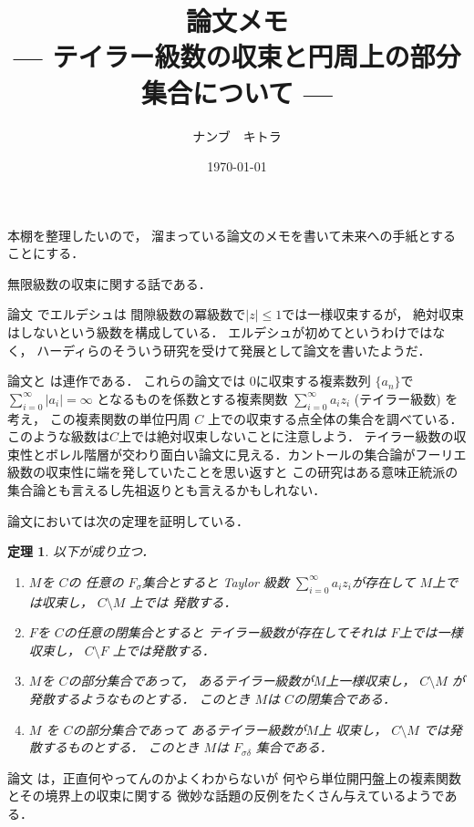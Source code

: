 \documentclass[leqno, a4paper, 12pt]{jsarticle}
\title{論文メモ
\large{\\--- テイラー級数の収束と円周上の部分集合について ---}
}
\author{ナンブ　キトラ}
\date{\today}
\newtheorem{thm}{定理}
\begin{document}
\maketitle

本棚を整理したいので，
溜まっている論文のメモを書いて未来への手紙とすることにする．


無限級数の収束に関する話である．

論文
\cite{MR0058734}でエルデシュは
間隙級数の冪級数で$|z|\le 1$では一様収束するが，
絶対収束はしないという級数を構成している．
エルデシュが初めてというわけではなく，
ハーディらのそういう研究を受けて発展として論文を書いたようだ．

論文\cite{MR0031049}と
\cite{MR0053210}
は連作である．
これらの論文では
$0$に収束する複素数列
$\{a_{n}\}$で
$\sum_{i=0}^{\infty}|a_{i}|=\infty$
となるものを係数とする複素関数
$\sum_{i=0}^{\infty}a_{i}z_{i}$
(テイラー級数)
を
考え，
この複素関数の単位円周
$C$
上での収束する点全体の集合を調べている．
このような級数は$C$上では絶対収束しないことに注意しよう．
テイラー級数の収束性とボレル階層が交わり面白い論文に見える．カントールの集合論がフーリエ級数の収束性に端を発していたことを思い返すと
この研究はある意味正統派の集合論とも言えるし先祖返りとも言えるかもしれない．

論文\cite{MR0031049}においては次の定理を証明している．
\begin{thm}
以下が成り立つ．
\begin{enumerate}[label=\textup{(\arabic*)}]
\item 
$M$を
$C$の
任意の
$F_{\sigma}$集合とすると
Taylor 級数
$\sum_{i=0}^{\infty}a_{i}z_{i}$が存在して
$M$上では収束し，
$C\setminus M$
上では
発散する．

\item 
$F$を
$C$の任意の閉集合とすると
テイラー級数が存在してそれは
$F$上では一様収束し，
$C\setminus F$
上では発散する．

\item 
$M$を
$C$の部分集合であって，
あるテイラー級数が$M$上一様収束し，
$C\setminus M$
が発散するようなものとする．
このとき
$M$は
$C$の閉集合である．

\item 

$M$
を
$C$の部分集合であって
あるテイラー級数が$M$上
収束し，
$C\setminus M$
では発散するものとする．
このとき
$M$は
$F_{\sigma\delta}$
集合である．

\end{enumerate}
\end{thm}
論文\cite{MR0053210}
は，正直何やってんのかよくわからないが
何やら単位開円盤上の複素関数とその境界上の収束に関する
微妙な話題の反例をたくさん与えているようである．
\end{document}
